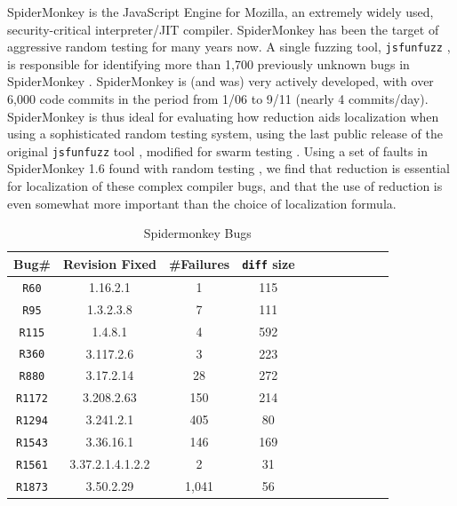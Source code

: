 SpiderMonkey is the JavaScript Engine for Mozilla, an extremely widely
used, security-critical interpreter/JIT compiler.  SpiderMonkey has
been the target of aggressive random testing for many years now.  A
single fuzzing tool, \texttt{jsfunfuzz} \cite{jsfunfuzz}, is
responsible for identifying more than 1,700 previously unknown bugs in
SpiderMonkey \cite{jsfunfuzzbugs}.  SpiderMonkey is (and was) very
actively developed, with over 6,000 code commits in the period from
1/06 to 9/11 (nearly 4 commits/day).  SpiderMonkey is thus ideal for
evaluating how reduction aids localization when using a sophisticated
random testing system, using the last public release of the original
\texttt{jsfunfuzz} tool \cite{jsfunfuzz}, modified for swarm testing \cite{ISSTA12}.
Using a set of faults in SpiderMonkey 1.6 found with random
testing \cite{PLDI13}, we find that reduction is
essential for localization of these complex compiler bugs, and
that the use of reduction is even somewhat more important than the
choice of localization formula.  


\begin{table}
\begin{center}
\begin{tabular}{|c||c|c|c|c|c||c|c|c|c|c|}
\hline
Bug\# & Revision Fixed &  \#Failures & {\tt diff} size \\
\hline
\hline
{\tt R60} & 1.16.2.1 & 1 & 115  \\
\hline
{\tt R95} & 1.3.2.3.8 & 7 & 111   \\
\hline
{\tt R115} & 1.4.8.1 & 4 & 592   \\
\hline
{\tt R360} & 3.117.2.6 & 3 & 223  \\
\hline
{\tt R880} & 3.17.2.14 & 28 & 272   \\ 
\hline
{\tt R1172} & 3.208.2.63 & 150 & 214  \\
\hline
{\tt R1294} & 3.241.2.1 & 405 & 80  \\
\hline
{\tt R1543} & 3.36.16.1 & 146 & 169  \\
\hline
{\tt R1561} & 3.37.2.1.4.1.2.2 & 2 & 31  \\
\hline
{\tt R1873} & 3.50.2.29 & 1,041 & 56  \\
\hline
\end{tabular}
\end{center}
\caption{Spidermonkey Bugs}
\label{tab:spiderbugs}
\end{table}


